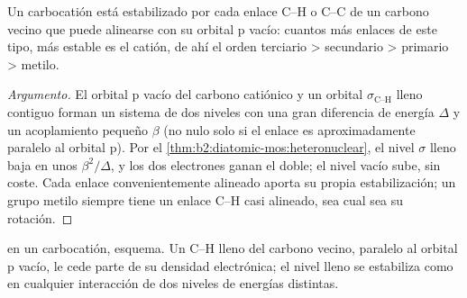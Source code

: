 \begin{proposition}\label{prop:b2:fragment-orbitals:hyperconjugation}
Un carbocatión está estabilizado por cada enlace C--H o C--C de un carbono vecino que
puede alinearse con su orbital p vacío: cuantos más enlaces de este tipo, más estable es el
catión, de ahí el orden terciario > secundario > primario > metilo.
\end{proposition}

\begin{proof}[Argumento]
El orbital p vacío del carbono catiónico y un orbital $\sigma_{\text{C--H}}$ lleno
contiguo forman un sistema de dos niveles con una gran diferencia de energía $\Delta$ y un acoplamiento pequeño
$\beta$ (no nulo solo si el enlace es aproximadamente paralelo al orbital p). Por el
\cref{thm:b2:diatomic-mos:heteronuclear}, el nivel $\sigma$ lleno baja en unos
$\beta^2/\Delta$, y los dos electrones ganan el doble; el nivel vacío sube, sin
coste. Cada enlace convenientemente alineado aporta su propia estabilización; un grupo metilo
siempre tiene un enlace C--H casi alineado, sea cual sea su rotación.
\end{proof}

\begin{omfigure}

{\small {} en un carbocatión, esquema. Un  C--H lleno
del carbono vecino, paralelo al orbital p vacío, le cede parte de su
densidad electrónica; el nivel lleno se estabiliza como en cualquier interacción de
dos niveles de energías distintas.}
\end{omfigure}

